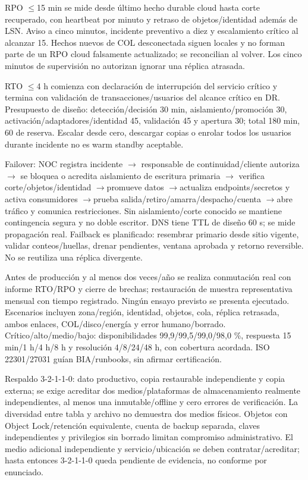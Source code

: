 \documentclass[11pt,letterpaper]{report}
\begin{document}
RPO $\leq$15 min se mide desde último hecho durable cloud hasta corte recuperado, con heartbeat por minuto y retraso de objetos/identidad además de LSN. Aviso a cinco minutos, incidente preventivo a diez y escalamiento crítico al alcanzar 15. Hechos nuevos de COL desconectada siguen locales y no forman parte de un RPO cloud falsamente actualizado; se reconcilian al volver. Los cinco minutos de supervisión no autorizan ignorar una réplica atrasada.

RTO $\leq$4 h comienza con declaración de interrupción del servicio crítico y termina con validación de transacciones/usuarios del alcance crítico en DR. Presupuesto de diseño: detección/decisión 30 min, aislamiento/promoción 30, activación/adaptadores/identidad 45, validación 45 y apertura 30; total 180 min, 60 de reserva. Escalar desde cero, descargar copias o enrolar todos los usuarios durante incidente no es warm standby aceptable.

Failover: NOC registra incidente $\rightarrow$ responsable de continuidad/cliente autoriza $\rightarrow$ se bloquea o acredita aislamiento de escritura primaria $\rightarrow$ verifica corte/objetos/identidad $\rightarrow$promueve datos $\rightarrow$actualiza endpoints/secretos y activa consumidores $\rightarrow$prueba salida/retiro/amarra/despacho/cuenta $\rightarrow$abre tráfico y comunica restricciones. Sin aislamiento/corte conocido se mantiene contingencia segura y no doble escritor. DNS tiene TTL de diseño 60 s; se mide propagación real. Failback es planificado: resembrar primario desde sitio vigente, validar conteos/huellas, drenar pendientes, ventana aprobada y retorno reversible. No se reutiliza una réplica divergente.

Antes de producción y al menos dos veces/año se realiza conmutación real con informe RTO/RPO y cierre de brechas; restauración de muestra representativa mensual con tiempo registrado. Ningún ensayo previsto se presenta ejecutado. Escenarios incluyen zona/región, identidad, objetos, cola, réplica retrasada, ambos enlaces, COL/disco/energía y error humano/borrado. Crítico/alto/medio/bajo: disponibilidades 99,9/99,5/99,0/98,0 \%, respuesta 15 min/1 h/4 h/8 h y resolución 4/8/24/48 h, con cobertura acordada. ISO 22301/27031 guían BIA/runbooks, sin afirmar certificación.

Respaldo 3-2-1-1-0: dato productivo, copia restaurable independiente y copia externa; se exige acreditar dos medios/plataformas de almacenamiento realmente independientes, al menos una inmutable/offline y cero errores de verificación. La diversidad entre tabla y archivo no demuestra dos medios físicos. Objetos con Object Lock/retención equivalente, cuenta de backup separada, claves independientes y privilegios sin borrado limitan compromiso administrativo. El medio adicional independiente y servicio/ubicación se deben contratar/acreditar; hasta entonces 3-2-1-1-0 queda pendiente de evidencia, no conforme por enunciado.
\end{document}
